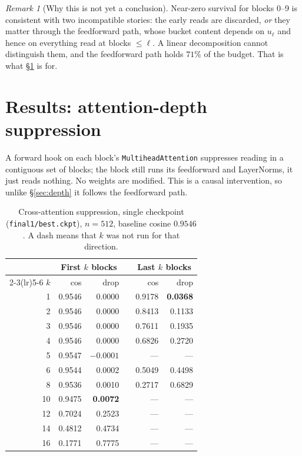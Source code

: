 \documentclass[11pt]{article}
\theoremstyle{plain}
\theoremstyle{remark}
\newtheorem*{remark}{Remark}
\newcommand{\code}[1]{\texttt{\small #1}}
\begin{document}
\begin{remark}[Why this is not yet a conclusion]
Near-zero survival for blocks 0--9 is consistent with two incompatible
stories: the early reads are discarded, \emph{or} they matter through the
feedforward path, whose bucket content depends on $u_\ell$ and hence on
everything read at blocks $\le\ell$. A linear decomposition cannot distinguish
them, and the feedforward path holds $71\%$ of the budget. That is what
\S\ref{sec:suppression} is for.
\end{remark}

\FloatBarrier
\section{Results: attention-depth suppression}
\label{sec:suppression}

A forward hook on each block's \code{MultiheadAttention} suppresses reading in
a contiguous set of blocks; the block still runs its feedforward and
LayerNorms, it just reads nothing. No weights are modified. This is a causal
intervention, so unlike \S\ref{sec:depth} it follows the feedforward path.

\begin{table}[htbp]
\centering
\small
\caption{Cross-attention suppression, single checkpoint
(\code{final1/best.ckpt}), $n = 512$, baseline cosine $0.9546$. A dash means
that $k$ was not run for that direction.}
\label{tab:suppress}
\begin{tabular}{@{}r r r c r r@{}}
\toprule
& \multicolumn{2}{c}{First $k$ blocks} & & \multicolumn{2}{c}{Last $k$ blocks} \\
\cmidrule(lr){2-3}\cmidrule(lr){5-6}
$k$ & cos & drop & & cos & drop \\
\midrule
1 & 0.9546 & 0.0000 & & 0.9178 & \textbf{0.0368} \\
2 & 0.9546 & 0.0000 & & 0.8413 & 0.1133 \\
3 & 0.9546 & 0.0000 & & 0.7611 & 0.1935 \\
4 & 0.9546 & 0.0000 & & 0.6826 & 0.2720 \\
5 & 0.9547 & $-0.0001$ & & --- & --- \\
6 & 0.9544 & 0.0002 & & 0.5049 & 0.4498 \\
8 & 0.9536 & 0.0010 & & 0.2717 & 0.6829 \\
10 & 0.9475 & \textbf{0.0072} & & --- & --- \\
12 & 0.7024 & 0.2523 & & --- & --- \\
14 & 0.4812 & 0.4734 & & --- & --- \\
16 & 0.1771 & 0.7775 & & --- & --- \\
\bottomrule
\end{tabular}
\end{table}
\end{document}
